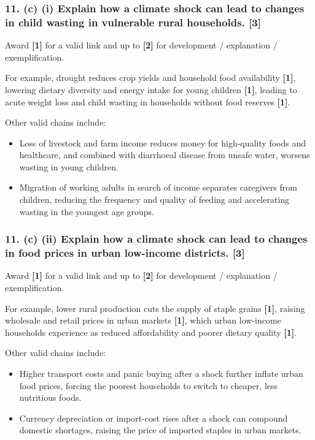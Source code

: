 \documentclass[11pt,a4paper]{article}
\newcommand{\term}[1]{\textbf{#1}}
\begin{document}
\subsubsection*{11. (c) (i) Explain how a climate shock can lead to changes in child wasting in vulnerable rural households. \hfill[3]}

Award \term{[1]} for a valid link and up to \term{[2]} for development /
explanation / exemplification.

For example, drought reduces crop yields and household food availability
\term{[1]}, lowering dietary diversity and energy intake for young children
\term{[1]}, leading to acute weight loss and child wasting in households
without food reserves \term{[1]}.

Other valid chains include:
\begin{itemize}
  \item Loss of livestock and farm income reduces money for high-quality foods
  and healthcare, and combined with diarrhoeal disease from unsafe water,
  worsens wasting in young children.
  \item Migration of working adults in search of income separates caregivers
  from children, reducing the frequency and quality of feeding and
  accelerating wasting in the youngest age groups.
\end{itemize}

\subsubsection*{11. (c) (ii) Explain how a climate shock can lead to changes in food prices in urban low-income districts. \hfill[3]}

Award \term{[1]} for a valid link and up to \term{[2]} for development /
explanation / exemplification.

For example, lower rural production cuts the supply of staple grains
\term{[1]}, raising wholesale and retail prices in urban markets \term{[1]},
which urban low-income households experience as reduced affordability and
poorer dietary quality \term{[1]}.

Other valid chains include:
\begin{itemize}
  \item Higher transport costs and panic buying after a shock further inflate
  urban food prices, forcing the poorest households to switch to cheaper, less
  nutritious foods.
  \item Currency depreciation or import-cost rises after a shock can compound
  domestic shortages, raising the price of imported staples in urban markets.
\end{itemize}
\end{document}
